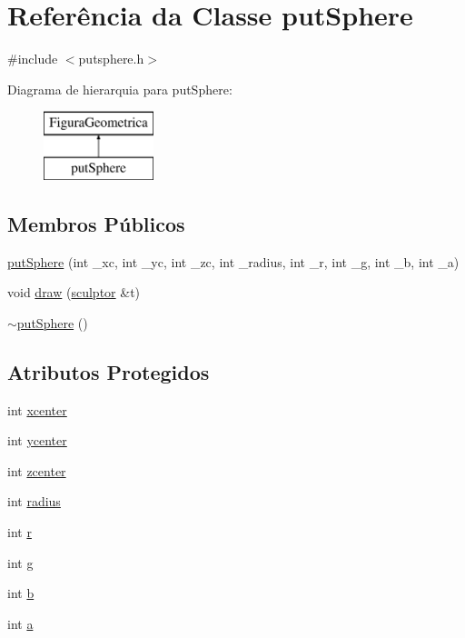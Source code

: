 \hypertarget{classput_sphere}{}\section{Referência da Classe put\+Sphere}
\label{classput_sphere}


{\ttfamily \#include $<$putsphere.\+h$>$}

Diagrama de hierarquia para put\+Sphere\+:\begin{figure}[H]
\begin{center}
\leavevmode
\includegraphics[height=2.000000cm]{classput_sphere}
\end{center}
\end{figure}
\subsection*{Membros Públicos}
\begin{DoxyCompactItemize}
\item 
\mbox{\hyperlink{classput_sphere_a100ee22588872d672546432834ec589a}{put\+Sphere}} (int \+\_\+xc, int \+\_\+yc, int \+\_\+zc, int \+\_\+radius, int \+\_\+r, int \+\_\+g, int \+\_\+b, int \+\_\+a)
\item 
void \mbox{\hyperlink{classput_sphere_a8a6aa041c7b3c8336ac703484f78e543}{draw}} (\mbox{\hyperlink{classsculptor}{sculptor}} \&t)
\item 
\mbox{\hyperlink{classput_sphere_aeca8caff4f0c76f50a375159a12300f5}{$\sim$put\+Sphere}} ()
\end{DoxyCompactItemize}
\subsection*{Atributos Protegidos}
\begin{DoxyCompactItemize}
\item 
int \mbox{\hyperlink{classput_sphere_ac324eda6406d2ecf5d6c3997a39e829e}{xcenter}}
\item 
int \mbox{\hyperlink{classput_sphere_a5f94acbed8bd302faa778dfa360f5eec}{ycenter}}
\item 
int \mbox{\hyperlink{classput_sphere_aabacf09086e1296a15409554471ac46f}{zcenter}}
\item 
int \mbox{\hyperlink{classput_sphere_adb319b941e6a88c1d7841157559ec15d}{radius}}
\item 
int \mbox{\hyperlink{classput_sphere_a59a4a1c3e95942977404a52943c9281f}{r}}
\item 
int \mbox{\hyperlink{classput_sphere_ae21f416a25908892e5b3ddada17bb932}{g}}
\item 
int \mbox{\hyperlink{classput_sphere_acf2af1d9dba4e8f859550f8d73f47014}{b}}
\item 
int \mbox{\hyperlink{classput_sphere_a51fa8d04aeacbb9768ab9da4557f6394}{a}}
\end{DoxyCompactItemize}


